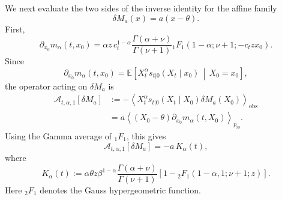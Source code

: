 \documentclass[11pt,twoside,fleqn]{article}
\begin{document}
We next evaluate the two sides of the inverse identity for the affine family
\begin{equation}
    \delta M_a(x)=a(x-\theta).
    \label{eq:cir_affine_family_appendix}
\end{equation}
First,
\begin{equation}
    \partial_{x_0}m_\alpha(t,x_0)
    =
    \alpha z\,c_t^{1-\alpha}
    \frac{\Gamma(\alpha+\nu)}{\Gamma(\nu+1)}
    {}_1F_1\!\left(
        1-\alpha;\nu+1;-c_t z x_0
    \right).
    \label{eq:cir_derivative_conditional_moment_appendix}
\end{equation}
Since
\begin{equation}
    \partial_{x_0}m_\alpha(t,x_0)
    =
    \mathbb{E}\!\left[
        X_t^\alpha
        s_{t|0}(X_t\mid x_0)
        \,\middle|\,
        X_0=x_0
    \right],
    \label{eq:cir_conditional_score_moment_identity_appendix}
\end{equation}
the operator acting on \(\delta M_a\) is
\begin{equation}
\begin{aligned}
    \mathcal{A}_{t,\alpha,1}[\delta M_a]
    &:=
    -
    \left\langle
        X_t^\alpha
        s_{t|0}(X_t\mid X_0)
        \delta M_a(X_0)
    \right\rangle_{\mathrm{obs}}
    \\
    &=
    a
    \left\langle
        (X_0-\theta)
        \partial_{x_0}m_\alpha(t,X_0)
    \right\rangle_{p_{\mathrm{ss}}}.
\end{aligned}
\label{eq:cir_operator_affine_appendix}
\end{equation}
Using the Gamma average of \({}_1F_1\), this gives
\begin{equation}
    \mathcal{A}_{t,\alpha,1}[\delta M_a]
    =
    -a\,K_\alpha(t),
    \label{eq:cir_operator_affine_reduction_appendix}
\end{equation}
where
\begin{equation}
    K_\alpha(t)
    :=
    \alpha\theta z
    \beta^{1-\alpha}
    \frac{\Gamma(\alpha+\nu)}{\Gamma(\nu+1)}
    \left[
        1
        -
        {}_2F_1\!\left(
            1-\alpha,1;\nu+1;z
        \right)
    \right].
    \label{eq:cir_K_alpha_def_appendix}
\end{equation}
Here \({}_2F_1\) denotes the Gauss hypergeometric function.
\end{document}
